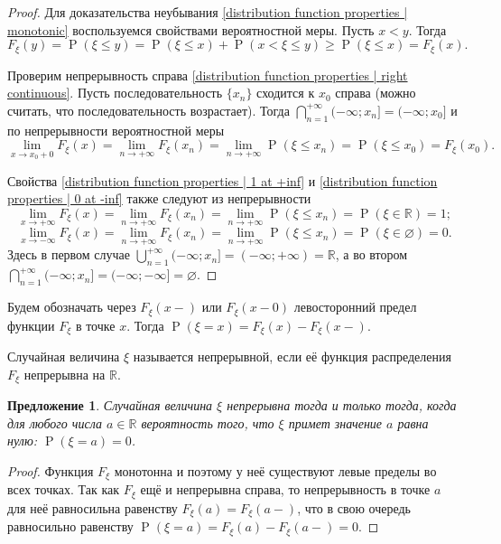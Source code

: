 \documentclass[12pt]{article}
\newtheorem{proposition}[theorem]{Предложение}
\numberwithin{theorem}{section}
\theoremstyle{definition}
\newcommand{\RR}{\mathbb{R}}
\newcommand{\prob}{\operatorname{P}}
\newcommand{\defin}[2]{\hypertarget{#2}{{\color{red} #1}}}
\begin{document}
	\begin{proof}
		Для доказательства неубывания \ref{distribution function properties | monotonic}
		воспользуемся свойствами вероятностной меры. Пусть $ x < y $.
		Тогда
		$$ F_\xi(y) = \prob(\xi \leqslant y) = \prob(\xi \leqslant x) + \prob(x < \xi \leqslant y) 
		\geqslant \prob(\xi \leqslant x) = F_\xi(x). $$
		
		Проверим непрерывность справа \ref{distribution function properties | right continuous}. 
		Пусть последовательность $ \{x_n\} $ сходится к $ x_0 $ справа (можно считать, что последовательность возрастает).
		Тогда $ \bigcap\limits_{n = 1}^{+\infty} (-\infty; x_n] = (-\infty; x_0] $
		и по непрерывности вероятностной меры 
		$$ \lim\limits_{x \to x_0+0} F_{\xi}(x) = \lim\limits_{n \to +\infty} F_{\xi}(x_n) 
		= \lim\limits_{n \to +\infty} \prob(\xi \leqslant x_n) = \prob(\xi \leqslant x_0) = F_{\xi}(x_0). $$
		
		Свойства \ref{distribution function properties | 1 at +inf}
		и \ref{distribution function properties | 0 at -inf} также следуют из непрерывности
		$$ \lim\limits_{x \to +\infty} F_{\xi}(x) = \lim\limits_{n \to +\infty} F_{\xi}(x_n) 
		= \lim\limits_{n \to +\infty} \prob(\xi \leqslant x_n) = \prob(\xi \in \RR) = 1; $$
		$$ \lim\limits_{x \to -\infty} F_{\xi}(x) = \lim\limits_{n \to +\infty} F_{\xi}(x_n) 
		= \lim\limits_{n \to +\infty} \prob(\xi \leqslant x_n) = \prob(\xi \in \varnothing) = 0. $$
		Здесь в первом случае $ \bigcup\limits_{n = 1}^{+\infty} (-\infty; x_n] = (-\infty; +\infty) = \RR $,
		а во втором $ \bigcap\limits_{n = 1}^{+\infty} (-\infty; x_n] = (-\infty; -\infty] = \varnothing $.
	\end{proof}
	
	Будем обозначать через $ F_\xi(x-) $ или $ F_\xi(x-0) $ левосторонний предел функции $ F_\xi $ в точке $ x $.
	Тогда $ \prob(\xi = x) = F_\xi(x) - F_\xi(x-) $. 
	
	Случайная величина $ \xi $ называется \defin{непрерывной}{continuous-random-variable},
	если её функция распределения $ F_\xi $ непрерывна на $ \RR $.
	
	\begin{proposition}
		Случайная величина $ \xi $ непрерывна тогда и только тогда, когда для любого числа $ a \in \RR $
		вероятность того, что $ \xi $ примет значение $ a $ равна нулю: $ \prob(\xi = a) = 0 $.
	\end{proposition}
	
	\begin{proof}
		Функция $ F_\xi $ монотонна и поэтому у неё существуют левые пределы во всех точках.
		Так как $ F_\xi $ ещё и непрерывна справа, то непрерывность в точке $ a $
		для неё равносильна равенству $ F_\xi(a) = F_\xi(a-) $,
		что в свою очередь равносильно равенству $ \prob(\xi = a) = F_\xi(a) - F_\xi(a-) = 0 $.
	\end{proof}
	
\end{document}
